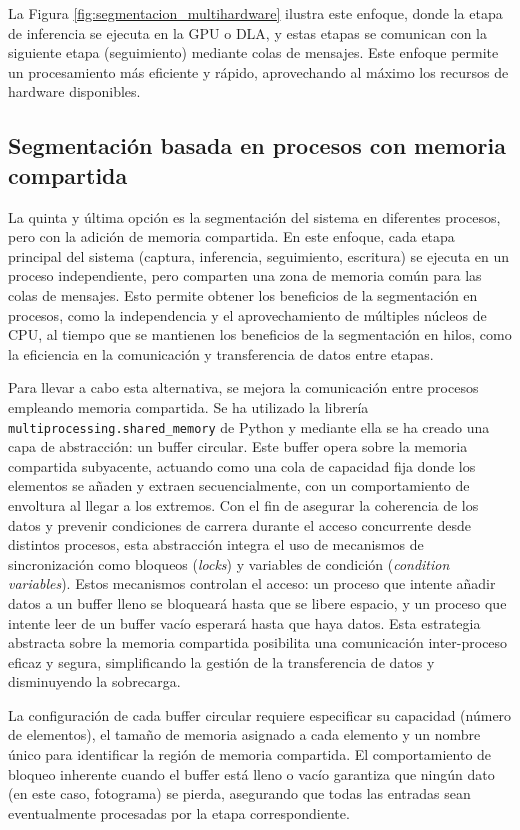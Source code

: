 \documentclass[11pt,spanish,listoffigures,listoftables]{tfgetsinf}
\begin{document}
La Figura \ref{fig:segmentacion_multihardware} ilustra este enfoque, donde la etapa de inferencia se ejecuta en la GPU o DLA, y estas etapas se comunican con la siguiente etapa (seguimiento) mediante colas de mensajes. Este enfoque permite un procesamiento más eficiente y rápido, aprovechando al máximo los recursos de hardware disponibles.


\subsection{Segmentación basada en procesos con memoria compartida}

La quinta y última opción es la segmentación del sistema en diferentes procesos, pero con la adición de memoria compartida. En este enfoque, cada etapa principal del sistema (captura, inferencia, seguimiento, escritura) se ejecuta en un proceso independiente, pero comparten una zona de memoria común para las colas de mensajes. Esto permite obtener los beneficios de la segmentación en procesos, como la independencia y el aprovechamiento de múltiples núcleos de CPU, al tiempo que se mantienen los beneficios de la segmentación en hilos, como la eficiencia en la comunicación y transferencia de datos entre etapas. 

Para llevar a cabo esta alternativa, se mejora la comunicación entre procesos empleando memoria compartida. Se ha utilizado la librería \texttt{multiprocessing.shared\_memory} de Python y mediante ella se ha creado una capa de abstracción: un buffer circular. Este buffer opera sobre la memoria compartida subyacente, actuando como una cola de capacidad fija donde los elementos se añaden y extraen secuencialmente, con un comportamiento de envoltura al llegar a los extremos. Con el fin de asegurar la coherencia de los datos y prevenir condiciones de carrera durante el acceso concurrente desde distintos procesos, esta abstracción integra el uso de mecanismos de sincronización como bloqueos (\textit{locks}) y variables de condición (\textit{condition variables}). Estos mecanismos controlan el acceso: un proceso que intente añadir datos a un buffer lleno se bloqueará hasta que se libere espacio, y un proceso que intente leer de un buffer vacío esperará hasta que haya datos. Esta estrategia abstracta sobre la memoria compartida posibilita una comunicación inter-proceso eficaz y segura, simplificando la gestión de la transferencia de datos y disminuyendo la sobrecarga.

La configuración de cada buffer circular requiere especificar su capacidad (número de elementos), el tamaño de memoria asignado a cada elemento y un nombre único para identificar la región de memoria compartida. El comportamiento de bloqueo inherente cuando el buffer está lleno o vacío garantiza que ningún dato (en este caso, fotograma) se pierda, asegurando que todas las entradas sean eventualmente procesadas por la etapa correspondiente.
\end{document}
